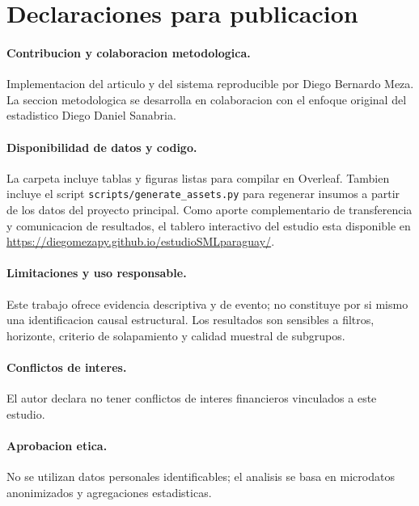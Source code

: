 \section*{Declaraciones para publicacion}

\paragraph{Contribucion y colaboracion metodologica.}
Implementacion del articulo y del sistema reproducible por Diego Bernardo Meza. La seccion metodologica se desarrolla en colaboracion con el enfoque original del estadistico Diego Daniel Sanabria.

\paragraph{Disponibilidad de datos y codigo.}
La carpeta incluye tablas y figuras listas para compilar en Overleaf. Tambien incluye el script \texttt{scripts/generate\_assets.py} para regenerar insumos a partir de los datos del proyecto principal. Como aporte complementario de transferencia y comunicacion de resultados, el tablero interactivo del estudio esta disponible en \url{https://diegomezapy.github.io/estudioSMLparaguay/}.

\paragraph{Limitaciones y uso responsable.}
Este trabajo ofrece evidencia descriptiva y de evento; no constituye por si mismo una identificacion causal estructural. Los resultados son sensibles a filtros, horizonte, criterio de solapamiento y calidad muestral de subgrupos.

\paragraph{Conflictos de interes.}
El autor declara no tener conflictos de interes financieros vinculados a este estudio.

\paragraph{Aprobacion etica.}
No se utilizan datos personales identificables; el analisis se basa en microdatos anonimizados y agregaciones estadisticas.
